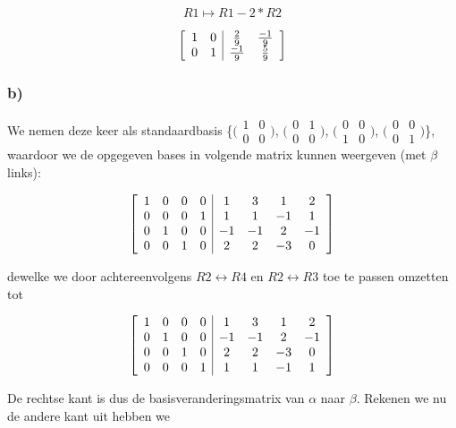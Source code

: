 \documentclass[lineaire_algebra_oplossingen.tex]{subfiles}
\begin{document}
\[R1 \mapsto R1 - 2*R2 \]

\[
\left[
\begin{array}{ c c | c c }
1 & 0 & \frac{2}{9} & \frac{-1}{9}\\
0 & 1 & \frac{-1}{9} & \frac{5}{9}
\end{array}
\right]
\]

\subsubsection*{b)}

We nemen deze keer als standaardbasis \{$\bigl(
\begin{smallmatrix}
1&0\\ 0&0
\end{smallmatrix}
\bigr)$,
$\bigl(
\begin{smallmatrix}
0&1\\ 0&0
\end{smallmatrix}
\bigr)$,
$\bigl(
\begin{smallmatrix}
0&0\\ 1&0
\end{smallmatrix}
\bigr)$,
$\bigl(
\begin{smallmatrix}
0&0\\ 0&1
\end{smallmatrix}
\bigr)$\}, waardoor we de opgegeven bases in volgende matrix kunnen weergeven (met $\beta$ links):

\[
\left[
\begin{array}{ c c c c | c c c c }
1 & 0 & 0 & 0 & 1 & 3 & 1 & 2\\
0 & 0 & 0 & 1 & 1 & 1 & -1 & 1\\
0 & 1 & 0 & 0 & -1 & -1 & 2 & -1\\
0 & 0 & 1 & 0 & 2 & 2 & -3 & 0
\end{array}
\right]
\]

dewelke we door achtereenvolgens $R2 \leftrightarrow R4$ en $R2 \leftrightarrow R3$ toe te passen omzetten tot

\[
\left[
\begin{array}{ c c c c | c c c c }
1 & 0 & 0 & 0 & 1 & 3 & 1 & 2\\
0 & 1 & 0 & 0 & -1 & -1 & 2 & -1\\
0 & 0 & 1 & 0 & 2 & 2 & -3 & 0\\
0 & 0 & 0 & 1 & 1 & 1 & -1 & 1
\end{array}
\right]
\]

De rechtse kant is dus de basisveranderingsmatrix van $\alpha$ naar $\beta$. Rekenen we nu de andere kant uit hebben we
\end{document}
